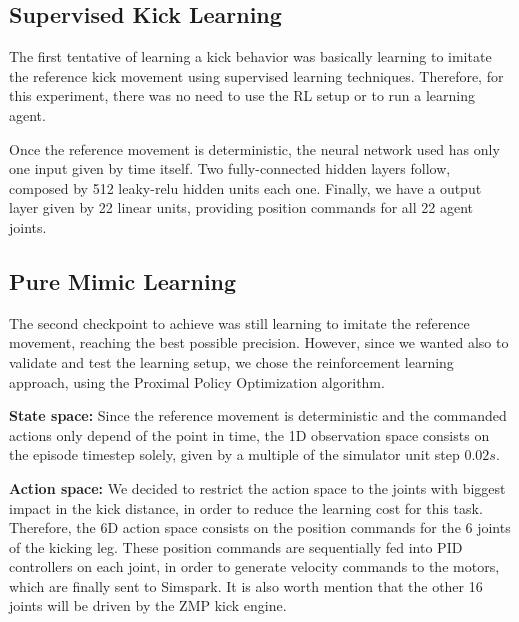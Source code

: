 \subsection{Supervised Kick Learning}

The first tentative of learning a kick behavior was basically learning to imitate the reference kick movement using supervised learning techniques. Therefore, for this experiment, there was no need to use the RL setup or to run a learning agent.

Once the reference movement is deterministic, the neural network used has only one input given by time itself. Two fully-connected hidden layers follow, composed by 512 leaky-relu hidden units each one. Finally, we have a output layer given by 22 linear units, providing position commands for all 22 agent joints.


\subsection{Pure Mimic Learning}

The second checkpoint to achieve was still learning to imitate the reference movement, reaching the best possible precision. However, since we wanted also to validate and test the learning setup, we chose the reinforcement learning approach, using the Proximal Policy Optimization algorithm.

\textbf{State space:} Since the reference movement is deterministic and the commanded actions only depend of the point in time, the 1D observation space consists on the episode timestep solely, given by a multiple of the simulator unit step $0.02s$.

\textbf{Action space:} We decided to restrict the action space to the joints with biggest impact in the kick distance, in order to reduce the learning cost for this task. Therefore, the 6D action space consists on the position commands for the 6 joints of the kicking leg. These position commands are sequentially fed into PID controllers on each joint, in order to generate velocity commands to the motors, which are finally sent to Simspark. It is also worth mention that the other 16 joints will be driven by the ZMP kick engine.

